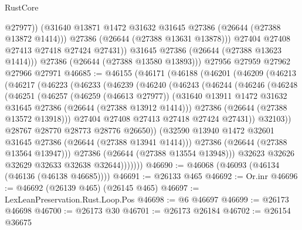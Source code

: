 \begin{lexlean}{RustCore}
\begin{coremodule}
                  @27977))
              (@31640 @13871 @1472 @31632 @31645 @27386 (@26644 (@27388 @13872 @1414)))
              @27386
              (@26644 (@27388 @13631 @13878)))
            @27404
            @27408
            @27413
            @27418
            @27424
            @27431))
        @31645
        @27386
        (@26644 (@27388 @13623 @1414)))
      @27386
      (@26644 (@27388 @13580 @13893)))
    @27956
    @27959
    @27962
    @27966
    @27971
@46685 := @46155
    (@46171
      (@46188
        (@46201
          (@46209
            (@46213
              (@46217
                (@46223
                  (@46233
                    (@46239
                      (@46240
                        (@46243
                          (@46244
                            (@46246
                              (@46248
                                (@46251
                                  (@46257
                                    (@46259 (@46613 @27977))
                                    (@31640
                                      @13911
                                      @1472
                                      @31632
                                      @31645
                                      @27386
                                      (@26644 (@27388 @13912 @1414)))
                                    @27386
                                    (@26644 (@27388 @13572 @13918)))
                                  @27404
                                  @27408
                                  @27413
                                  @27418
                                  @27424
                                  @27431))
                              @32103))
                          @28767
                          @28770
                          @28773
                          @28776
                          @26650))
                      (@32590 @13940 @1472 @32601 @31645 @27386 (@26644 (@27388 @13941 @1414)))
                      @27386
                      (@26644 (@27388 @13564 @13947)))
                    @27386
                    (@26644 (@27388 @13554 @13948)))
                  @32623
                  @32626
                  @32629
                  @32633
                  @32638
                  @32644)))))))
@46690 := @46068 (@46093 (@46134 (@46136 (@46138 @46685))))
@46691 := @26133 @465
@46692 := Or.inr
@46696 := @46692 (@26139 @465) (@26145 @465)
@46697 := LexLeanPreservation.Rust.Loop.Pos
@46698 := @6 @46697
@46699 := @26173 @46698
@46700 := @26173 @30
@46701 := @26173 @26184
@46702 := @26154 @36675

\end{coremodule}
\end{lexlean}
